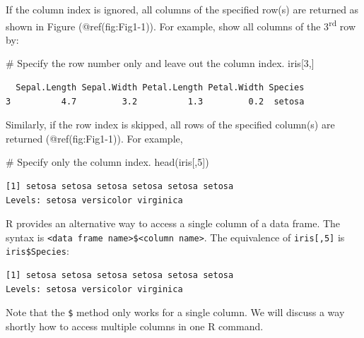 \documentclass[
  letterpaper,
]{book}
\newenvironment{Shaded}{\begin{snugshade}}{\end{snugshade}}
\newcommand{\CommentTok}[1]{\textcolor[rgb]{0.37,0.37,0.37}{#1}}
\newcommand{\DecValTok}[1]{\textcolor[rgb]{0.68,0.00,0.00}{#1}}
\newcommand{\FunctionTok}[1]{\textcolor[rgb]{0.28,0.35,0.67}{#1}}
\newcommand{\NormalTok}[1]{\textcolor[rgb]{0.00,0.23,0.31}{#1}}
\newcommand{\SpecialCharTok}[1]{\textcolor[rgb]{0.37,0.37,0.37}{#1}}
\begin{document}
If the column index is ignored, all columns of the specified row(s) are
returned as shown in Figure (@ref(fig:Fig1-1)). For example, show all
columns of the 3\textsuperscript{rd} row by:

\begin{Shaded}
\begin{Highlighting}[]
\CommentTok{\# Specify the row number only and leave out the column index.}
\NormalTok{iris[}\DecValTok{3}\NormalTok{,]}
\end{Highlighting}
\end{Shaded}

\begin{verbatim}
  Sepal.Length Sepal.Width Petal.Length Petal.Width Species
3          4.7         3.2          1.3         0.2  setosa
\end{verbatim}

Similarly, if the row index is skipped, all rows of the specified
column(s) are returned (@ref(fig:Fig1-1)). For example,

\begin{Shaded}
\begin{Highlighting}[]
\CommentTok{\# Specify only the column index.}
\FunctionTok{head}\NormalTok{(iris[,}\DecValTok{5}\NormalTok{])}
\end{Highlighting}
\end{Shaded}

\begin{verbatim}
[1] setosa setosa setosa setosa setosa setosa
Levels: setosa versicolor virginica
\end{verbatim}

R provides an alternative way to access a single column of a data frame.
The syntax is
\texttt{\textless{}data\ frame\ name\textgreater{}\$\textless{}column\ name\textgreater{}}.
The equivalence of \texttt{iris{[},5{]}} is \texttt{iris\$Species}:

\begin{Shaded}
\end{Shaded}

\begin{verbatim}
[1] setosa setosa setosa setosa setosa setosa
Levels: setosa versicolor virginica
\end{verbatim}

Note that the \texttt{\$} method only works for a single column. We will
discuss a way shortly how to access multiple columns in one R command.
\end{document}
